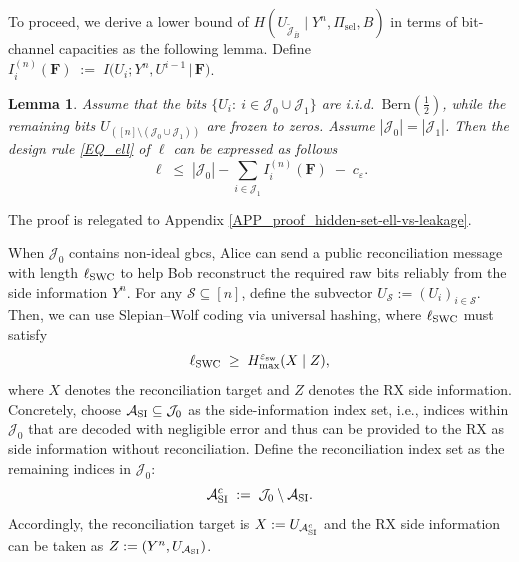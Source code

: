 \documentclass[onecolumn]{IEEEtran} %
\newcommand{\bF}{\mathbf F}
\newcommand{\1}{\mathbbm{1}}
\theoremstyle{boldremark}
\newtheorem{lemma}{Lemma}
\begin{document}
To proceed, we derive a lower bound of $H(U_{\tilde{\mathcal J}_{\bar{B}}}\mid Y^n,\Pi_{\mathrm{sel}},B)$ in terms of bit-channel capacities as the following lemma. Define $I_i^{(n)}(\bF)\;:=\;I\!\bigl(U_i;Y^n,U^{i-1}\,\big|\,\mathbf F\bigr)$. 

\begin{lemma}\label{lem:hidden-set-ell-vs-leakage}
Assume that the bits $\{U_i:\ i\in\mathcal J_0\cup\mathcal J_1\}$ are i.i.d.\ $\mathrm{Bern}(\tfrac12)$, while the remaining bits $U_{([n]\setminus(\mathcal J_0\cup\mathcal J_1))}$
are frozen to zeros. Assume $|\mathcal J_0|=|\mathcal J_1|$.
Then the design rule \eqref{EQ_ell} of $\ell$ can be expressed as follows
\begin{equation}\label{eq:ell-vs-L}
\ell
\;\le\;
|\mathcal J_0|-\sum_{i\in\mathcal J_1} I_i^{(n)}(\mathbf F)
\;-\;
c_{\varepsilon}.
\end{equation}
\end{lemma}

The proof is relegated to Appendix \ref{APP_proof_hidden-set-ell-vs-leakage}.


When $\mathcal J_0$ contains non-ideal \gls{gbcs}, Alice can send a public reconciliation
message with length $\ell_{\rm SWC}$ to help Bob reconstruct the required raw
bits reliably from the side information $Y^n$. For any $\mathcal{S}\subseteq[n]$, define the subvector
$U_{\mathcal{S}} := (U_i)_{i\in\mathcal{S}}$. Then, we can use Slepian--Wolf coding via universal hashing, where
$\ell_{\rm SWC}$ must satisfy \cite[Proposition~6.8]{SudaWatanabe25}
\begin{equation}\label{eq:swc-one-shot}
\ell_{\rm SWC} \;\ge\; H_{\max}^{\varepsilon_{\rm sw}}(X\mid Z),
\end{equation}
where $X$ denotes the reconciliation target and $Z$ denotes the RX side information.
Concretely, choose $\mathcal A_{\rm SI}\subseteq \mathcal J_0$ as the side-information index set, i.e., indices within $\mathcal J_0$
that are decoded with negligible error and thus can be provided to the RX as side information without
reconciliation. Define the reconciliation index set as the remaining indices in $\mathcal J_0$:
\[
\mathcal A_{\rm SI}^c \;:=\; \mathcal J_0\setminus \mathcal A_{\rm SI}.
\]
Accordingly, the reconciliation target is $X:=U_{\mathcal A_{\rm SI}^c}$ and the RX side information can be taken as
$Z:=(Y^n,U_{\mathcal A_{\rm SI}})$.
\end{document}
